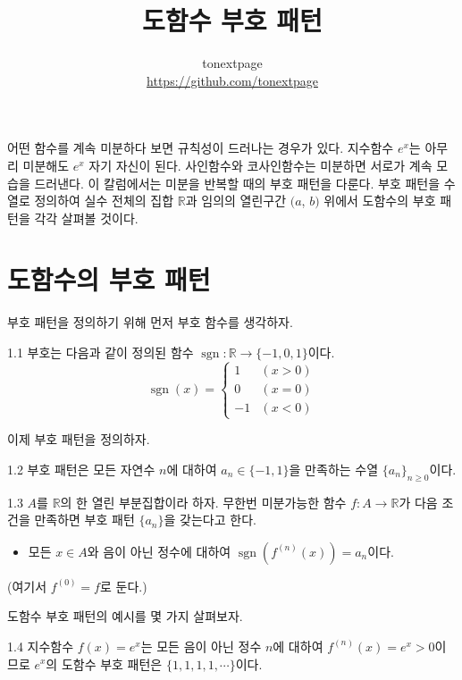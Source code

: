 \documentclass{article}
\title{도함수 부호 패턴}
\author{tonextpage\\
    \url{https://github.com/tonextpage}
}
\date{}
\begin{document}
\maketitle

\noindent 
어떤 함수를 계속 미분하다 보면 규칙성이 드러나는 경우가 있다.
지수함수 $e^x$는 아무리 미분해도 $e^x$ 자기 자신이 된다.
사인함수와 코사인함수는 미분하면 서로가 계속 모습을 드러낸다.
이 칼럼에서는 미분을 반복할 때의 부호 패턴을 다룬다.
부호 패턴을 수열로 정의하여 실수 전체의 집합 $\mathbb R$과 임의의 열린구간 $(a$, $b)$ 위에서 도함수의 부호 패턴을 각각 살펴볼 것이다.

\section{도함수의 부호 패턴}
부호 패턴을 정의하기 위해 먼저 부호 함수를 생각하자.

\begin{dfn}{}{1.1}
    부호는 다음과 같이 정의된 함수 $\operatorname{sgn}:\mathbb R \to \{-1, 0, 1\}$이다.
    \[
        \operatorname{sgn}(x)=\begin{cases}
            1 & (x>0)\\
            0 & (x=0)\\
            -1 & (x<0)
        \end{cases}
    \]
\end{dfn}

이제 부호 패턴을 정의하자.

\begin{dfn}{}{1.2}
    부호 패턴은 모든 자연수 $n$에 대하여 $a_n\in\{-1,1\}$을 만족하는 수열 $\{a_n\}_{n\geq0}$이다.
\end{dfn}

\begin{dfn}{}{1.3}
    $A$를 $\mathbb{R}$의 한 열린 부분집합이라 하자. 무한번 미분가능한 함수 $f:A\to\mathbb R$가 다음 조건을 만족하면 부호 패턴 $\{a_n\}$을 갖는다고 한다.
    \begin{itemize}
        \item 모든 $x\in A$와 음이 아닌 정수에 대하여 $\operatorname{sgn}(f^{(n)}(x))=a_n$이다.
    \end{itemize}
    (여기서 $f^{(0)}=f$로 둔다.)
\end{dfn}

도함수 부호 패턴의 예시를 몇 가지 살펴보자.

\begin{example}{}{1.4}
    지수함수 $f(x)=e^x$는 모든 음이 아닌 정수 $n$에 대하여 $f^{(n)}(x)=e^x>0$이므로 $e^x$의 도함수 부호 패턴은 $\{1,1,1,1,\cdots\}$이다.
\end{example}
\end{document}
